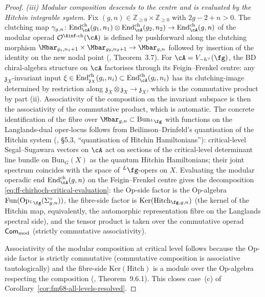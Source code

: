 \begin{proof}
\emph{(iii) Modular composition descends to the centre and is
evaluated by the Hitchin integrable system.} Fix $(g, n) \in
\mathbb{Z}_{\ge 0}\times\mathbb{Z}_{\ge 0}$ with $2g-2+n>0$. The
clutching map
$\gamma_{g,n}\colon
\mathrm{End}^{\mathrm{ch}}_{\cA}(g_1, n_1)\otimes
\mathrm{End}^{\mathrm{ch}}_{\cA}(g_2, n_2) \to
\mathrm{End}^{\mathrm{ch}}_{\cA}(g, n)$ of the modular operad
$\mathcal{O}^{\Ainf\text{-ch}}(\cA)$ is defined by pushforward
along the clutching morphism
$\Mbar_{g_1,n_1+1}\times \Mbar_{g_2,n_2+1} \to \Mbar_{g,n}$ followed
by insertion of the identity on the new nodal point
(\cite{GeK98}, Theorem~3.7). For $\cA = V_{-h^\vee}(\fg)$, the
BD chiral-algebra structure on $\cA$ factorises through its
Feigin--Frenkel centre: any $\mathfrak{z}_X$-invariant input
$\xi \in \mathrm{End}^{\mathrm{ch}}_{\mathfrak{z}_X}(g_i,n_i)
\subset \mathrm{End}^{\mathrm{ch}}_{\cA}(g_i,n_i)$ has its
clutching-image determined by restriction along
$\mathfrak{z}_X\otimes\mathfrak{z}_X \to \mathfrak{z}_X$, which is
the commutative product by part (ii). Associativity of the
composition on the invariant subspace is then the associativity of
the commutative product, which is automatic. The concrete
identification of the fibre over
$\Mbar_{g,n}\subset\mathrm{Bun}_{{}^L\fg}$ with functions on the
Langlands-dual oper-locus follows from Beilinson--Drinfeld's
quantisation of the Hitchin system
(\cite{BD04}, \S 5.3, ``quantisation of Hitchin Hamiltonians''):
critical-level Segal--Sugawara vectors on $\cA$ act on sections of
the critical-level determinant line bundle on
$\mathrm{Bun}_G(X)$ as the quantum Hitchin Hamiltonians; their
joint spectrum coincides with the space of ${}^L\fg$-opers on $X$.
Evaluating the modular operadic end
$\mathrm{End}^{\mathrm{ch}}_{\cA}(g,n)$ on the Feigin--Frenkel
centre gives the decomposition
\eqref{eq:ff-chirhoch-critical-evaluation}: the $\mathrm{Op}$-side
factor is the Op-algebra $\mathrm{Fun}(\mathrm{Op}_{{}^L\fg}
(\Sigma_{g,n}^\circ))$, the fibre-side factor is
$\mathrm{Ker}(\mathrm{Hitch}_{\fg,g,n})$ (the kernel of the Hitchin
map, equivalently, the automorphic representation fibre on the
Langlands spectral side), and the tensor product is taken over the
commutative operad $\mathsf{Com}_{\mathrm{mod}}$ (strictly commutative associativity).

Associativity of the modular composition at critical level follows
because the Op-side factor is strictly commutative (commutative
composition is associative tautologically) and the fibre-side
$\mathrm{Ker}(\mathrm{Hitch})$ is a module over the Op-algebra
respecting the composition (\cite{FrenkelLanglands}, Theorem~9.6.1).
This closes case~(c) of
Corollary~\ref{cor:fm68-all-levels-resolved}.
\end{proof}

